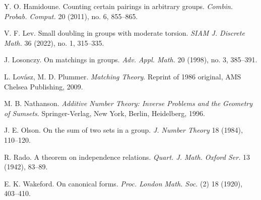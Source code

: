 \documentclass[11pt]{amsart}
\theoremstyle{definition}
\theoremstyle{remark}
\begin{document}
\begin{thebibliography}{10}
Y. O. Hamidoune. Counting certain pairings in arbitrary groups. \textit{Combin. Probab. Comput.} 20 (2011), no. 6, 855--865.

V. F. Lev. Small doubling in groups with moderate torsion. \textit{SIAM J. Discrete Math.} 36 (2022), no. 1, 315--335.

J. Losonczy. On matchings in groups. \textit{Adv. Appl. Math.} 20 (1998), no. 3, 385--391.

L. Lov\'{a}sz, M. D. Plummer. \textit{Matching Theory}. Reprint of 1986 original, AMS Chelsea Publishing, 2009.

M. B. Nathanson. \textit{Additive Number Theory: Inverse Problems and the Geometry of Sumsets}. Springer-Verlag, New York, Berlin, Heidelberg, 1996.

J. E. Olson. On the sum of two sets in a group. \textit{J. Number Theory} 18 (1984), 110--120.

R. Rado. A theorem on independence relations. \textit{Quart. J. Math. Oxford Ser.} 13 (1942), 83--89.

E. K. Wakeford. On canonical forms. \textit{Proc. London Math. Soc.} (2) 18 (1920), 403--410.


 \end{thebibliography} 
\end{document}

